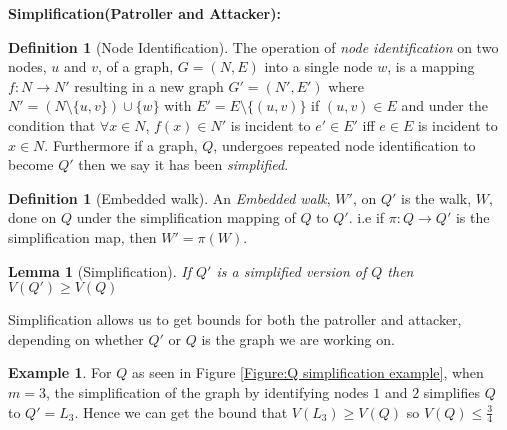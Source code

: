 \documentclass[a4paper,10pt]{article}
\newtheorem{lemma}[theorem]{Lemma}
\theoremstyle{definition}
\newtheorem{definition}[theorem]{Definition}
\theoremstyle{definition}
\newtheorem{example}[theorem]{Example}
\theoremstyle{remark}
\theoremstyle{definition}
\begin{document}
\textbf{Simplification(Patroller and Attacker):}

\begin{definition}[Node Identification]
The operation of \textit{node identification} on two nodes, $u$ and $v$, of a graph, $G=(N,E)$ into a single node $w$, is a mapping $f:N \rightarrow N'$ resulting in a new graph $G'=(N',E')$ where $N'=(N \setminus  \{u,v\}) \cup \{w\}$ with $E'=E \setminus \{(u,v)\}$ if $(u,v) \in E$ and under the condition that $\forall x \in N$, $f(x) \in N'$ is incident to $e' \in E'$ iff $e \in E$ is incident to $x \in N$.
Furthermore if a graph, $Q$, undergoes repeated node identification to become $Q'$ then we say it has been \textit{simplified}. 
\end{definition}

\begin{definition}[Embedded walk]
An \textit{Embedded walk}, $W'$, on $Q'$ is the walk, $W$, done on $Q$ under the simplification mapping of $Q$ to $Q'$. i.e if $\pi :Q \rightarrow Q'$ is the simplification map, then $W'=\pi (W)$.
\end{definition}

\begin{lemma}[Simplification]
If $Q'$ is a simplified version of $Q$ then $V(Q') \geq V(Q)$
\end{lemma}

Simplification allows us to get bounds for both the patroller and attacker, depending on whether $Q'$ or $Q$ is the graph we are working on.

\begin{example}
For $Q$ as seen in Figure \ref{Figure:Q simplification example}, when $m=3$, the simplification of the graph by identifying nodes $1$ and $2$ simplifies $Q$ to $Q'=L_{3}$. Hence we can get the bound that $V(L_{3}) \geq  V(Q)$ so $V(Q) \leq \frac{3}{4} $
\end{example}
\end{document}
